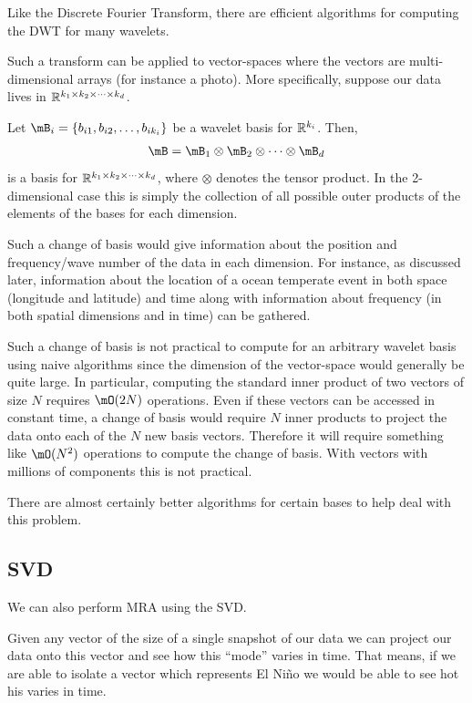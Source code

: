 \documentclass[10pt]{article}
\begin{document}
Like the Discrete Fourier Transform, there are efficient algorithms for computing the DWT for many wavelets.

Such a transform can be applied to vector-spaces where the vectors are multi-dimensional arrays (for instance a photo).
More specifically, suppose our data lives in \( \mathbb{R}^{k_1\times k_2\times\cdots\times k_d} \).

Let \( \mB_i = \{b_{i1},b_{i2},\ldots, b_{ik_i}\} \) be a wavelet basis for \( \mathbb{R}^{k_i} \). Then,
\begin{align}
    \mB = \mB_1\otimes \mB_2 \otimes \cdots \otimes \mB_d
\end{align}
is a basis for \( \mathbb{R}^{k_1\times k_2\times\cdots\times k_d} \), where \( \otimes \) denotes the tensor product. In the 2-dimensional case this is simply the collection of all possible outer products of the elements of the bases for each dimension.

Such a change of basis would give information about the position and frequency/wave number of the data in each dimension. For instance, as discussed later, information about the location of a ocean temperate event in both space (longitude and latitude) and time along with information about frequency (in both spatial dimensions and in time) can be gathered.

Such a change of basis is not practical to compute for an arbitrary wavelet basis using naive algorithms since the dimension of the vector-space would generally be quite large. In particular, computing the standard inner product of two vectors of size \( N \) requires \( \mO(2N) \) operations. Even if these vectors can be accessed in constant time, a change of basis would require \( N \) inner products to project the data onto each of the \( N \) new basis vectors. Therefore it will require something like \( \mO(N^2) \) operations to compute the change of basis. With vectors with millions of components this is not practical.

There are almost certainly better algorithms for certain bases to help deal with this problem.

\subsection{SVD}
We can also perform MRA using the SVD.

Given any vector of the size of a single snapshot of our data we can project our data onto this vector and see how this ``mode'' varies in time. That means, if we are able to isolate a vector which represents El Ni\~no we would be able to see hot his varies in time.
\end{document}
